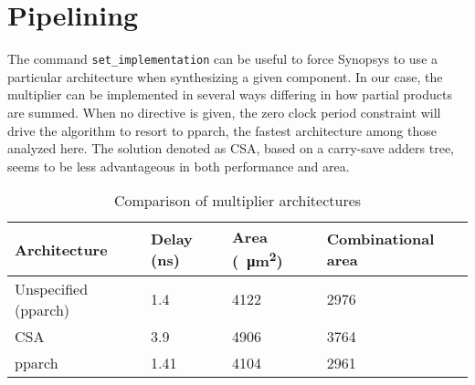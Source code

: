 \section{Pipelining}
The command \texttt{set\_implementation} can be useful to force Synopsys to use a particular architecture when synthesizing a given component. In our case, the multiplier can be implemented in several ways differing in how partial products are summed. When no directive is given, the zero clock period constraint will drive the algorithm to resort to pparch, the fastest architecture among those analyzed here. The solution denoted as CSA, based on a carry-save adders tree, seems to be less advantageous in both performance and area.
\begin{table}[htbp]
	\centering
	\begin{tabular}{|l|l|l|l|}\hline
		Architecture & Delay (ns) & Area (\SI{}{\micro m^2}) & Combinational area \\\hline
		Unspecified (pparch) & 1.4 & 4122 & 2976 \\\hline
		CSA & 3.9 & 4906 & 3764 \\\hline
		pparch & 1.41 & 4104 & 2961 \\\hline
	\end{tabular}
\caption{Comparison of multiplier architectures}
\end{table}
